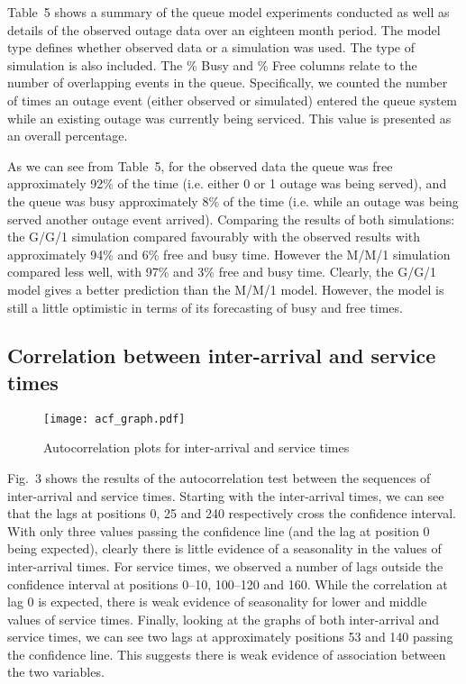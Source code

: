 \documentclass[5p]{elsarticle}
\begin{document}
Table~5 shows a summary of the queue model experiments conducted as well as details of the observed outage data over an eighteen month period. The model type defines whether observed data or a simulation was used. The type of simulation is also included. The \% Busy and \% Free columns relate to the number of overlapping events in the queue. Specifically, we counted the number of times an outage event (either observed or simulated) entered the queue system while an existing outage was currently being serviced. This value is presented as an overall percentage. 


As we can see from Table~5, for the observed data the queue was free approximately 92\% of the time (i.e. either 0 or 1 outage was being served), and the queue was busy approximately 8\% of the time (i.e. while an outage was being served another outage event arrived). Comparing the results of both simulations: the G/G/1 simulation compared favourably with the observed results with approximately 94\% and 6\% free and busy time. However the M/M/1 simulation compared less well, with 97\% and 3\% free and busy time. Clearly, the G/G/1 model gives a better prediction than the M/M/1 model. However, the model is still a little optimistic in terms of its forecasting of busy and free times.

\subsection{Correlation between inter-arrival and service times}

\begin{figure*}[]
\begin{center}
\texttt{[image: acf\_graph.pdf]} 
\caption{Autocorrelation plots for inter-arrival and service times}
\end{center}
\label{fig:acfgraphs}
\end{figure*}

Fig.~3 shows the results of the autocorrelation test between the sequences of inter-arrival and service times. Starting with the inter-arrival times, we can see that the lags at positions 0, 25 and 240 respectively cross the confidence interval. With only three values passing the confidence line (and the lag at position 0 being expected), clearly there is little evidence of a seasonality in the values of inter-arrival times. For service times, we observed a number of lags outside the confidence interval at positions 0--10, 100--120 and 160. While the correlation at lag 0 is expected, there is weak evidence of seasonality for lower and middle values of service times. Finally, looking at the graphs of both inter-arrival and service times, we can see two lags at approximately positions 53 and 140 passing the confidence line. This suggests there is weak evidence of association between the two variables.
\end{document}
